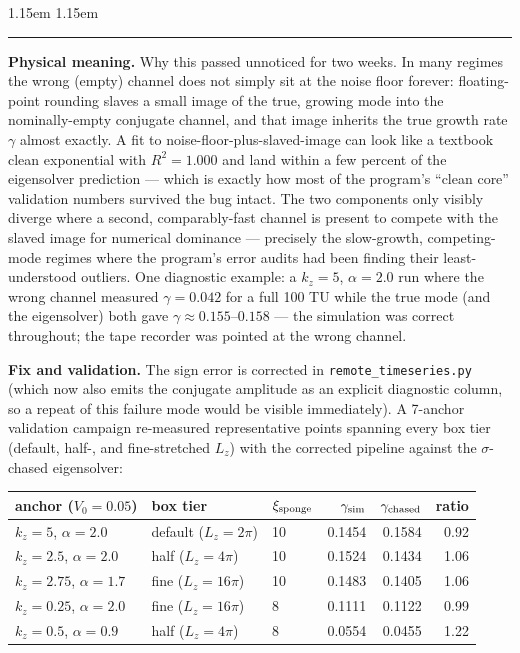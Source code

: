 \documentclass[11pt,a4paper]{article}
\numberwithin{equation}{section}
\theoremstyle{remark}
\newenvironment{physmeaning}%
{\par\medskip\noindent
 \begin{list}{}{\leftmargin 1.15em \rightmargin 1.15em \listparindent 0pt
 \itemindent 0pt \parsep 2pt \topsep 2pt}\item\relax
 \small\textcolor{meancol}{\rule[-0.6ex]{2.6pt}{2.4ex}}\hspace{0.55em}%
 \textcolor{meancol}{\textbf{Physical meaning.}}\hspace{0.5em}\ignorespaces}%
{\end{list}\medskip}
\newcommand{\Vo}{V_0}
\newcommand{\kz}{k_z}
\begin{document}
\begin{physmeaning}
Why this passed unnoticed for two weeks. In many regimes the wrong
(empty) channel does not simply sit at the noise floor forever: floating-point
rounding slaves a small image of the true, growing mode into the nominally-empty
conjugate channel, and that image inherits the true growth rate $\gamma$
almost exactly. A fit to noise-floor-plus-slaved-image can look like a
textbook clean exponential with $R^2=1.000$ and land within a few percent
of the eigensolver prediction --- which is exactly how most of the
program's ``clean core'' validation numbers survived the bug intact. The
two components only visibly diverge where a second, comparably-fast
channel is present to compete with the slaved image for numerical
dominance --- precisely the slow-growth, competing-mode regimes where the
program's error audits had been finding their least-understood outliers.
One diagnostic example: a $\kz=5$, $\alpha=2.0$ run where the wrong
channel measured $\gamma=0.042$ for a full 100 TU while the true mode (and
the eigensolver) both gave $\gamma\approx0.155$--$0.158$ --- the
simulation was correct throughout; the tape recorder was pointed at the
wrong channel.
\end{physmeaning}

\textbf{Fix and validation.} The sign error is corrected in
\texttt{remote\_timeseries.py} (which now also emits the conjugate
amplitude as an explicit diagnostic column, so a repeat of this failure
mode would be visible immediately). A 7-anchor validation campaign
re-measured representative points spanning every box tier (default,
half-, and fine-stretched $L_z$) with the corrected pipeline against the
$\sigma$-chased eigensolver:

\begin{center}
\begin{tabular}{lllrrr}
\toprule
anchor ($\Vo=0.05$) & box tier & $\xi_{\rm sponge}$ & $\gamma_{\rm sim}$ & $\gamma_{\rm chased}$ & ratio\\
\midrule
$\kz=5$, $\alpha=2.0$ & default ($L_z=2\pi$) & 10 & 0.1454 & 0.1584 & 0.92\\
$\kz=2.5$, $\alpha=2.0$ & half ($L_z=4\pi$) & 10 & 0.1524 & 0.1434 & 1.06\\
$\kz=2.75$, $\alpha=1.7$ & fine ($L_z=16\pi$) & 10 & 0.1483 & 0.1405 & 1.06\\
$\kz=0.25$, $\alpha=2.0$ & fine ($L_z=16\pi$) & 8 & 0.1111 & 0.1122 & 0.99\\
$\kz=0.5$, $\alpha=0.9$ & half ($L_z=4\pi$) & 8 & 0.0554 & 0.0455 & 1.22\\
\bottomrule
\end{tabular}
\end{center}
\end{document}
